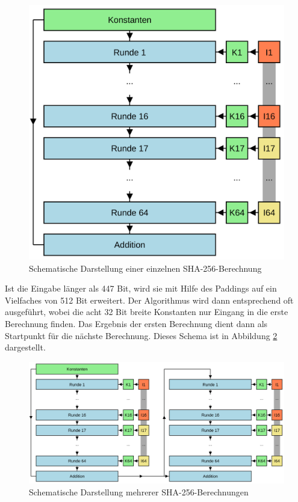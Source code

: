 \begin{figure}[!h]
  \centering
  \includegraphics[scale=0.4]{images/sha256single}
  \caption{Schematische Darstellung einer einzelnen SHA-256-Berechnung}
  \label{fig:sha256single}
\end{figure}

Ist die Eingabe länger als 447 Bit, wird sie mit Hilfe des Paddings auf ein Vielfaches von 512 Bit erweitert. Der Algorithmus wird dann entsprechend oft ausgeführt,
wobei die acht 32 Bit breite Konstanten nur Eingang in die erste Berechnung finden. Das Ergebnis der ersten Berechnung dient dann als Startpunkt für die nächste
Berechnung. Dieses Schema ist in Abbildung \ref{fig:sha256multi} dargestellt.

\begin{figure}[!h]
  \centering
  \includegraphics[scale=0.4]{images/sha256multi}
  \caption{Schematische Darstellung mehrerer SHA-256-Berechnungen}
  \label{fig:sha256multi}
\end{figure}





